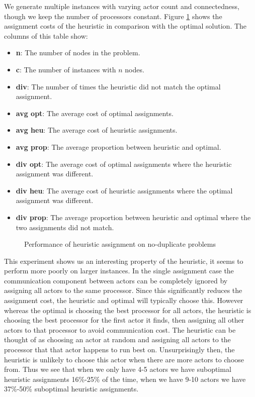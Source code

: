 We generate multiple instances with varying actor count and connectedness, though we keep the number of processors constant.
Figure \ref{figSTable} shows the assignment costs of the heuristic in comparison with the optimal solution.
The columns of this table show:
\begin{itemize}
	\item {\bf n}: The number of nodes in the problem.
	\item {\bf c}: The number of instances with $n$ nodes.
	\item {\bf div}: The number of times the heuristic did not match the optimal assignment.
	\item {\bf avg opt}: The average cost of optimal assignments.
	\item {\bf avg heu}: The average cost of heuristic assignments.
	\item {\bf avg prop}: The average proportion between heuristic and optimal.
	\item {\bf div opt}: The average cost of optimal assignments where the heuristic assignment was different.
	\item {\bf div heu}: The average cost of heuristic assignments where the optimal assignment was different.
	\item {\bf div prop}: The average proportion between heuristic and optimal where the two assignments did not match.
\end{itemize}

\begin{figure}
\begin{center}
	
\caption{Performance of heuristic assignment on no-duplicate problems}
\label{figSTable}
\end{center}
\end{figure}

This experiment shows us an interesting property of the heuristic, it seems to perform more poorly on larger instances.
In the single assignment case the communication component between actors can be completely ignored by assigning all actors to the same processor.
Since this significantly reduces the assignment cost, the heuristic and optimal will typically choose this.
However whereas the optimal is choosing the best processor for all actors, the heuristic is choosing the best processor for the first actor it finds, then assigning all other actors to that processor to avoid communication cost.
The heuristic can be thought of as choosing an actor at random and assigning all actors to the processor that that actor happens to run best on.
Unsurprisingly then, the heuristic is unlikely to choose this actor when there are more actors to choose from.
Thus we see that when we only have 4-5 actors we have suboptimal heuristic assignments 16\%-25\% of the time, when we have 9-10 actors we have 37\%-50\% suboptimal heuristic assignments.

